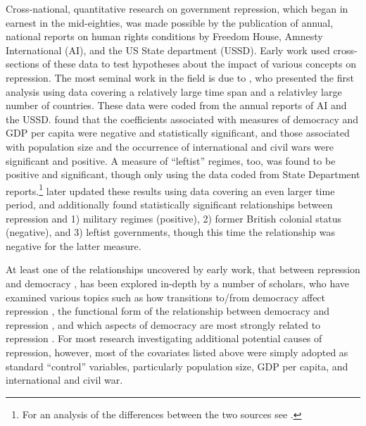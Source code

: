 \documentclass[12pt]{article}
\begin{document}
Cross-national, quantitative research on government repression, which began in earnest in the mid-eighties, was made possible by the publication of annual, national reports on human rights conditions by Freedom House, Amnesty International (AI), and the US State department (USSD). Early work used cross-sections of these data to test hypotheses about the impact of various concepts on repression. The most seminal work in the field is due to \citet{PoeTate1994}, who presented the first analysis using data covering a relatively large time span and a relativley large number of countries. These data were coded from the annual reports of AI and the USSD. \citet{PoeTate1994} found that the coefficients associated with measures of democracy and GDP per capita were negative and statistically significant, and those associated with population size and the occurrence of international and civil wars were significant and positive. A measure of ``leftist'' regimes, too, was found to be positive and significant, though only using the data coded from State Department reports.\footnote{For an analysis of the differences between the two sources see \citet{Poe2001}.} \citet{Poeetal1999} later updated these results using data covering an even larger time period, and additionally found statistically significant relationships between repression and 1) military regimes (positive), 2) former British colonial status (negative), and 3) leftist governments, though this time the relationship was negative for the latter measure. 

At least one of the relationships uncovered by early work, that between repression and democracy \citep{Henderson1991,PoeTate1994}, has been explored in-depth by a number of scholars, who have examined various topics such as how transitions to/from democracy affect repression \citep{Davenport1999}, the functional form of the relationship between democracy and repression \citep{Fein1995,DavenportArmstrong2004}, and which aspects of democracy are most strongly related to repression \citep{BDMetal2005, Davenport2007}. For most research investigating additional potential causes of repression, however, most of the covariates listed above were simply adopted as standard ``control'' variables, particularly population size, GDP per capita, and international and civil war. 
\end{document}
